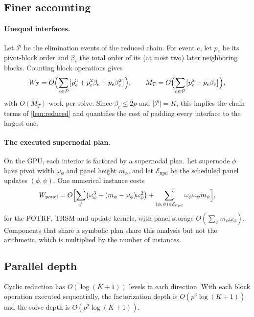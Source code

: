 \subsection{Finer accounting}

\paragraph{Unequal interfaces.}
Let $\mathcal P$ be the elimination events of the reduced chain. For event $e$, let
$p_e$ be its pivot-block order and $\beta_e$ the total order of its (at most two)
later neighboring blocks. Counting block operations gives
\begin{equation}\label{eq:ragged}
W_T=O\Bigl(\sum_{e\in\mathcal P}\bigl[p_e^3+p_e^2\beta_e+p_e\beta_e^2\bigr]\Bigr),\qquad
M_T=O\Bigl(\sum_{e\in\mathcal P}\bigl[p_e^2+p_e\beta_e\bigr]\Bigr),
\end{equation}
with $O(M_T)$ work per solve. Since $\beta_e\le2p$ and $|\mathcal P|=K$, this
implies the chain terms of \cref{lem:reduced} and quantifies the cost of padding
every interface to the largest one.

\paragraph{The executed supernodal plan.}
On the GPU, each interior is factored by a supernodal plan. Let supernode $\phi$
have pivot width $\omega_\phi$ and panel height $m_\phi$, and let
$\mathcal E_{\mathrm{upd}}$ be the scheduled panel updates $(\phi,\psi)$. One
numerical instance costs
\begin{equation}\label{eq:panel}
W_{\mathrm{panel}}=O\Bigl[\sum_{\phi}\bigl(\omega_\phi^3+(m_\phi-\omega_\phi)\omega_\phi^2\bigr)
+\sum_{(\phi,\psi)\in\mathcal E_{\mathrm{upd}}}\omega_\phi\omega_\psi m_\psi\Bigr],
\end{equation}
for the POTRF, TRSM and update kernels, with panel storage
$O(\sum_\phi m_\phi\omega_\phi)$. Components that share a symbolic plan share this
analysis but not the arithmetic, which is multiplied by the number of instances.

\subsection{Parallel depth}

\begin{proposition}\label{prop:depth}
Cyclic reduction has $O(\log(K+1))$ levels in each direction. With each block
operation executed sequentially, the factorization depth is $O(p^3\log(K+1))$ and
the solve depth is $O(p^2\log(K+1))$.
\end{proposition}

